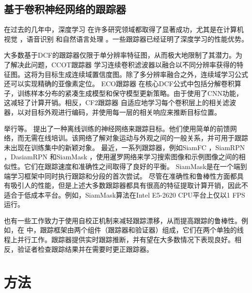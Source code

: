 \subsection{基于卷积神经网络的跟踪器}
在过去的几年中，深度学习 \cite{Goodfellow2015DeepL} 在许多研究领域都取得了显著成功，尤其是在计算机视觉 \cite{Matiz2019InductiveCP, Zhu2019RotatedCR, Xiao2019DenseSE}，语音识别 \cite{Kim2016JointCB, Liu2019AttentionGD}和自然语言处理 \cite{Vinyals2014GrammarAA, Yousfi2017ContributionOR}。一些跟踪器已经证明了深度学习的性能优势。

大多数基于DCF的跟踪器仅限于单分辨率特征图，从而极大地限制了其潜力。为了解决此问题，CCOT跟踪器 \cite{CCOT} 学习连续卷积滤波器以融合以不同分辨率获得的特征图。这将为目标生成连续域置信度图。除了多分辨率融合之外，连续域学习公式还可以实现精确的亚像素定位。
ECO跟踪器 \cite{Danelljan2017ECOEC} 在核心DCF公式中包括分解卷积算子，训练样本分布的紧凑生成模型和保守模型更新策略。由于使用了CNN功能，这减轻了计算开销。相反，CF2跟踪器 \cite{Ma2015HierarchicalCF} 自适应地学习每个卷积层上的相关滤波器，以对目标外观进行编码，并使用每一层的相关响应来推断目标位置。

举行等。 \cite{GOTURN} 提出了一种离线训练的神经网络来跟踪目标。他们使用简单的前馈网络，而无需在线培训。该网络了解对象运动与外观之间的一般关系，并可用于跟踪未出现在训练集中的新颖对象。
最近，一系列跟踪器，例如SiamFC \cite{SiamFC}，SiamRPN \cite{SiamRPN}，DasiamRPN \cite{zhu2018distractor} 和SiamMask \cite{Wang2018SiamMask}，使用暹罗网络来学习搜索图像和示例图像之间的相似性。它们在跟踪速度和准确性之间取得了良好的平衡。 SiamMask是在一个端到端学习框架中同时执行跟踪和分段的首次尝试。
尽管在准确性和鲁棒性方面都具有吸引人的性能，但是上述大多数跟踪器都具有很高的特征提取计算开销，因此不适合于低成本平台。例如，SiamMask算法在Intel E5-2620 CPU平台上仅以1 FPS运行。

也有一些工作致力于使用自校正机制来减轻跟踪漂移，从而提高跟踪的鲁棒性。例如，在 \cite{fan2018parallel}中，跟踪框架由两个组件（跟踪器和验证器）组成，它们在两个单独的线程上并行工作。跟踪器提供实时跟踪推断，并有望在大多数情况下表现良好。相反，验证者检查跟踪结果并在需要时更正跟踪器。

\section{方法}


